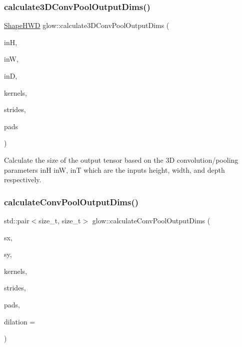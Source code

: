 \subsubsection{\texorpdfstring{calculate3\+D\+Conv\+Pool\+Output\+Dims()}{calculate3DConvPoolOutputDims()}}
{\footnotesize\ttfamily \hyperlink{structglow_1_1_shape_h_w_d}{Shape\+H\+WD} glow\+::calculate3\+D\+Conv\+Pool\+Output\+Dims (\begin{DoxyParamCaption}\item[{size\+\_\+t}]{inH,  }\item[{size\+\_\+t}]{inW,  }\item[{size\+\_\+t}]{inD,  }\item[{llvm\+::\+Array\+Ref$<$ \hyperlink{namespaceglow_a0ca574644e1e42ef193a9947fb4d8911}{unsigned\+\_\+t} $>$}]{kernels,  }\item[{llvm\+::\+Array\+Ref$<$ \hyperlink{namespaceglow_a0ca574644e1e42ef193a9947fb4d8911}{unsigned\+\_\+t} $>$}]{strides,  }\item[{llvm\+::\+Array\+Ref$<$ \hyperlink{namespaceglow_a0ca574644e1e42ef193a9947fb4d8911}{unsigned\+\_\+t} $>$}]{pads }\end{DoxyParamCaption})\hspace{0.3cm}{\ttfamily [inline]}}

Calculate the size of the output tensor based on the 3D convolution/pooling parameters {\ttfamily inH} {\ttfamily inW}, {\ttfamily inT} which are the input\textquotesingle{}s height, width, and depth respectively. \mbox{\label{namespaceglow_a3623979e9cf3437802bf2f23d15b425e}} 
\subsubsection{\texorpdfstring{calculate\+Conv\+Pool\+Output\+Dims()}{calculateConvPoolOutputDims()}}
{\footnotesize\ttfamily std\+::pair$<$size\+\_\+t, size\+\_\+t$>$ glow\+::calculate\+Conv\+Pool\+Output\+Dims (\begin{DoxyParamCaption}\item[{size\+\_\+t}]{sx,  }\item[{size\+\_\+t}]{sy,  }\item[{llvm\+::\+Array\+Ref$<$ \hyperlink{namespaceglow_a0ca574644e1e42ef193a9947fb4d8911}{unsigned\+\_\+t} $>$}]{kernels,  }\item[{llvm\+::\+Array\+Ref$<$ \hyperlink{namespaceglow_a0ca574644e1e42ef193a9947fb4d8911}{unsigned\+\_\+t} $>$}]{strides,  }\item[{llvm\+::\+Array\+Ref$<$ \hyperlink{namespaceglow_a0ca574644e1e42ef193a9947fb4d8911}{unsigned\+\_\+t} $>$}]{pads,  }\item[{\hyperlink{namespaceglow_a0ca574644e1e42ef193a9947fb4d8911}{unsigned\+\_\+t}}]{dilation = {} }\end{DoxyParamCaption})\hspace{0.3cm}{\ttfamily [inline]}}

